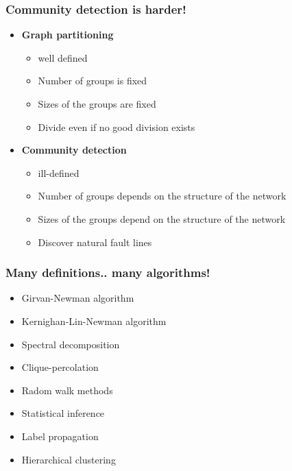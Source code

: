 \documentclass{beamer}
\begin{document}
\begin{frame}
    \frametitle{Community detection is harder!}
  \begin{itemize}
        \setlength\itemsep{2em}
        \item{{\bf Graph partitioning}
        \begin{itemize}
        \setlength\itemsep{0.5em}
            \item{\small well defined}
            \item{\small Number of groups is fixed}
            \item{\small Sizes of the groups are fixed}
            \item{\small Divide even if no good division exists}
        \end{itemize}
        }
        \item{{\bf Community detection}
        \begin{itemize}
        \setlength\itemsep{0.5em}
            \item{ill-defined}
            \item{\small Number of groups depends on the structure of the network}
            \item{\small Sizes of the groups depend on the structure of the network}
            \item{\small Discover natural fault lines}
        \end{itemize}
        }
    \end{itemize}
\end{frame}
\begin{frame}
    \frametitle{Many definitions.. many algorithms!}
    \centering
    \begin{itemize}
    \setlength\itemsep{1em}
        \item{Girvan-Newman algorithm}
        \item{Kernighan-Lin-Newman algorithm}
        \item{Spectral decomposition}
        \item{Clique-percolation}
        \item{Radom walk methods}
        \item{Statistical inference}
        \item{Label propagation}
        \item{Hierarchical clustering}
    \end{itemize}
\end{frame}
\end{document}
